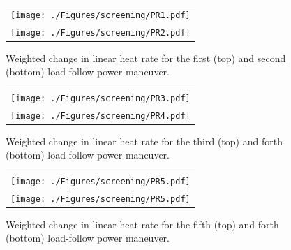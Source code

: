 \documentclass[edeposit,fullpage,11pt]{uiucthesis2009}
\begin{document}
\begin{landscape}
\begin{figure}[h]
\begin{tabular}{c}
\texttt{[image: ./Figures/screening/PR1.pdf]} \\
\texttt{[image: ./Figures/screening/PR2.pdf]} \\
\end{tabular}
\caption{Weighted change in linear heat rate for the first (top) and second (bottom) load-follow power maneuver.}
\label{fig:lf_PR1}
\end{figure}
\end{landscape}

\begin{landscape}
\begin{figure}[h]
\begin{tabular}{c}
\texttt{[image: ./Figures/screening/PR3.pdf]} \\
\texttt{[image: ./Figures/screening/PR4.pdf]} \\
\end{tabular}
\caption{Weighted change in linear heat rate for the third (top) and forth (bottom) load-follow power maneuver.}
\label{fig:lf_PR2}
\end{figure}
\end{landscape}

\begin{landscape}
\begin{figure}[h]
\begin{tabular}{c}
\texttt{[image: ./Figures/screening/PR5.pdf]} \\
\texttt{[image: ./Figures/screening/PR5.pdf]} \\
\end{tabular}
\caption{Weighted change in linear heat rate for the fifth (top) and forth (bottom) load-follow power maneuver.}
\label{fig:lf_PR3}
\end{figure}
\end{landscape}
\end{document}

